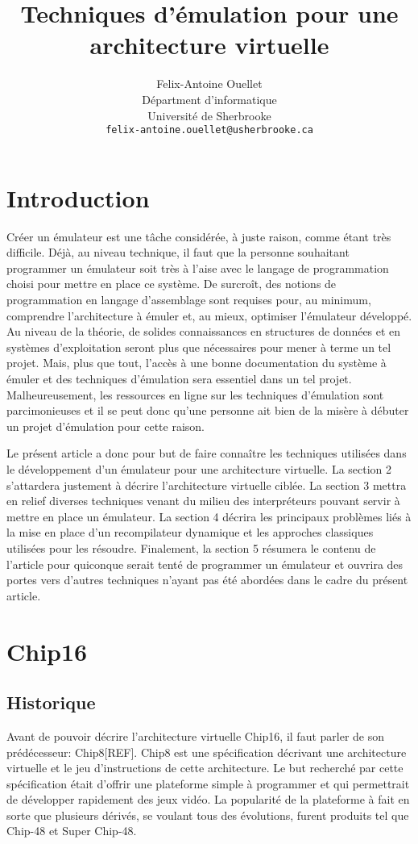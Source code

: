 \documentclass{article} %
\title{Techniques d'émulation pour une architecture virtuelle}
\author{
Felix-Antoine Ouellet \\
Départment d'informatique \\
Université de Sherbrooke \\
\texttt{felix-antoine.ouellet@usherbrooke.ca} \\
}
\begin{document}
\maketitle

\begin{abstract}
\end{abstract}

\section{Introduction}
Créer un émulateur est une tâche considérée, à juste raison, comme étant très difficile. Déjà, au niveau technique, il faut que la personne souhaitant programmer un émulateur soit très à l'aise avec le langage de programmation choisi pour mettre en place ce système. De surcroît, des notions de programmation en langage d'assemblage sont requises pour, au minimum, comprendre l'architecture à émuler et, au mieux, optimiser l'émulateur développé. Au niveau de la théorie, de solides connaissances en structures de données et en systèmes d'exploitation seront plus que nécessaires pour mener à terme un tel projet. Mais, plus que tout, l'accès à une bonne documentation du système à émuler et des techniques d'émulation sera essentiel dans un tel projet. Malheureusement, les ressources en ligne sur les techniques d'émulation sont parcimonieuses et il se peut donc qu'une personne ait bien de la misère à débuter un projet d'émulation pour cette raison.

Le présent article a donc pour but de faire connaître les techniques utilisées dans le développement d'un émulateur pour une architecture virtuelle. La section 2 s'attardera justement à décrire l'architecture virtuelle ciblée. La section 3 mettra en relief diverses techniques venant du milieu des interpréteurs pouvant servir à mettre en place un émulateur. La section 4 décrira les principaux problèmes liés à la mise en place d'un recompilateur dynamique et les approches classiques utilisées pour les résoudre. Finalement, la section 5 résumera le contenu de l'article pour quiconque serait tenté de programmer un émulateur et ouvrira des portes vers d'autres techniques n'ayant pas été abordées dans le cadre du présent article.

\section{Chip16}

\subsection{Historique}
Avant de pouvoir décrire l'architecture virtuelle Chip16, il faut parler de son prédécesseur: Chip8[REF]. Chip8 est une spécification décrivant une architecture virtuelle et le jeu d'instructions de cette architecture. Le but recherché par cette spécification était d'offrir une plateforme simple à programmer et qui permettrait de développer rapidement des jeux vidéo. La popularité de la plateforme à fait en sorte que plusieurs dérivés, se voulant tous des évolutions, furent produits tel que Chip-48 et Super Chip-48.
\end{document}
